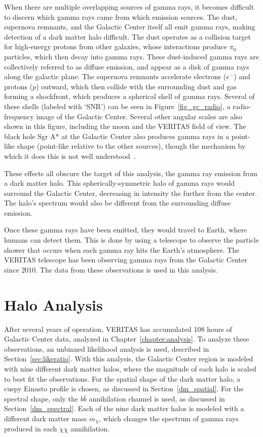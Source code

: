   When there are multiple overlapping sources of gamma rays, it becomes difficult to discern which gamma rays came from which emission sources.
  The dust, supernova remnants, and the Galactic Center itself all emit gamma rays, making detection of a dark matter halo difficult.
  The dust operates as a collision target for high-energy protons from other galaxies, whose interactions produce $\pi_0$ particles, which then decay into gamma rays.
  These dust-induced gamma rays are collectively referred to as diffuse emission, and appear as a disk of gamma rays along the galactic plane.
  The supernova remnants accelerate electrons ($e^{-}$) and protons ($p$) outward, which then collide with the surrounding dust and gas forming a shockfront, which produces a spherical shell of gamma rays.
  Several of these shells (labeled with `SNR') can be seen in Figure~\ref{fig_gc_radio}, a radio-frequency image of the Galactic Center.
  Several other angular scales are also shown in this figure, including the moon and the VERITAS field of view.
  The black hole Sgr A* at the Galactic Center also produces gamma rays in a point-like shape (point-like relative to the other sources), though the mechanism by which it does this is not well understood~\cite{gal_cent_still_undetermined}.

  These effects all obscure the target of this analysis, the gamma ray emission from a dark matter halo.
  This spherically-symmetric halo of gamma rays would surround the Galactic Center, decreasing in intensity the further from the center.
  The halo's spectrum would also be different from the surrounding diffuse emission.

  Once these gamma rays have been emitted, they would travel to Earth, where humans can detect them.
  This is done by using a telescope to observe the particle shower that occurs when each gamma ray hits the Earth's atmosphere.
  The VERITAS telescope has been observing gamma rays from the Galactic Center since 2010.
  The data from these observations is used in this analysis.

\FloatBarrier

\section{Halo Analysis}
  After several years of operation, VERITAS has accumulated 108 hours of Galactic Center data, analyzed in Chapter~\ref{chapter:analysis}.
  To analyze these observations, an unbinned likelihood analysis is used, described in Section~\ref{sec:likeratio}.
  With this analysis, the Galactic Center region is modeled with nine different dark matter halos, where the magnitude of each halo is scaled to best fit the observations.
  For the spatial shape of the dark matter halo, a cuspy Einasto profile is chosen, as discussed in Section~\ref{dm_spatial}.
  For the spectral shape, only the $b\bar{b}$ annihilation channel is used, as discussed in Section~\ref{dm_spectral}.
  Each of the nine dark matter halos is modeled with a different dark matter mass $m_{\chi}$, which changes the spectrum of gamma rays produced in each $\chi\chi$ annihilation.
  
